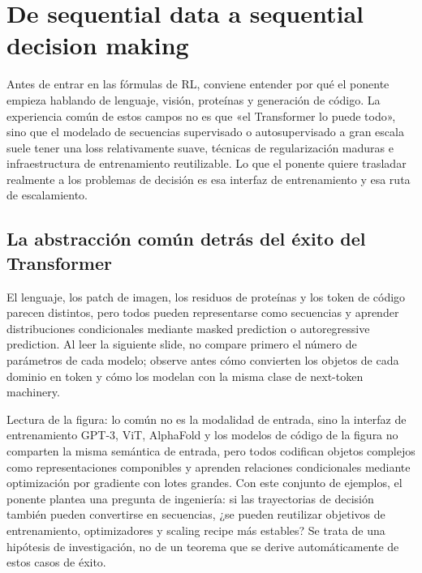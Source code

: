 \section{De sequential data a sequential decision making}

Antes de entrar en las fórmulas de RL, conviene entender por qué el ponente empieza hablando de lenguaje, visión, proteínas y generación de código. La experiencia común de estos campos no es que «el Transformer lo puede todo», sino que el modelado de secuencias supervisado o autosupervisado a gran escala suele tener una loss relativamente suave, técnicas de regularización maduras e infraestructura de entrenamiento reutilizable. Lo que el ponente quiere trasladar realmente a los problemas de decisión es esa interfaz de entrenamiento y esa ruta de escalamiento.

\subsection{La abstracción común detrás del éxito del Transformer}

El lenguaje, los patch de imagen, los residuos de proteínas y los token de código parecen distintos, pero todos pueden representarse como secuencias y aprender distribuciones condicionales mediante masked prediction o autoregressive prediction. Al leer la siguiente slide, no compare primero el número de parámetros de cada modelo; observe antes cómo convierten los objetos de cada dominio en token y cómo los modelan con la misma clase de next-token machinery.


\begin{knowledgebox}{Lectura de la figura: lo común no es la modalidad de entrada, sino la interfaz de entrenamiento}
GPT-3, ViT, AlphaFold y los modelos de código de la figura no comparten la misma semántica de entrada, pero todos codifican objetos complejos como representaciones componibles y aprenden relaciones condicionales mediante optimización por gradiente con lotes grandes. Con este conjunto de ejemplos, el ponente plantea una pregunta de ingeniería: si las trayectorias de decisión también pueden convertirse en secuencias, ¿se pueden reutilizar objetivos de entrenamiento, optimizadores y scaling recipe más estables? Se trata de una hipótesis de investigación, no de un teorema que se derive automáticamente de estos casos de éxito.
\end{knowledgebox}

